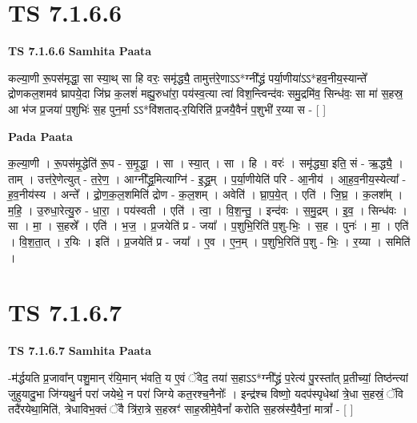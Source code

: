 \documentclass[17pt]{extarticle}
\begin{document}

\section{ TS 7.1.6.6 }

\textbf{TS 7.1.6.6 } \newline
\textbf{Samhita Paata} \newline

कल्या॒णी रू॒पस॑मृद्धा॒ सा स्या॒थ् सा हि वरः॒ समृ॑द्ध्यै॒ तामुत्त॑रे॒णाऽऽ*ग्नी᳚द्ध्रं पर्या॒णीया॑ऽऽ*हव॒नीय॒स्यान्ते᳚ द्रोणकल॒शमव॑ घ्रापये॒दा जि॑घ्र क॒लशं॑ मह्यु॒रुधा॑रा॒ पय॑स्व॒त्या त्वा॑ विश॒न्त्विन्द॑वः समु॒द्रमि॑व॒ सिन्ध॑वः॒ सा मा॑ स॒हस्र॒ आ भ॑ज प्र॒जया॑ प॒शुभिः॑ स॒ह पुन॒र्मा ऽऽ*वि॑शताद्-र॒यिरिति॑ प्र॒जयै॒वैनं॑ प॒शुभी॑ र॒य्या स - [  ] \newline

\textbf{Pada Paata} \newline

क॒ल्या॒णी । रू॒पस॑मृ॒द्धेति॑ रू॒प - स॒मृ॒द्धा॒ । सा । स्या॒त् । सा । हि । वरः॑ । समृ॑द्ध्या॒ इति॒ सं - ऋ॒द्ध्यै॒ । ताम् । उत्त॑रे॒णेत्युत् - त॒रे॒ण॒ । आग्नी᳚द्ध्र॒मित्याग्नि॑ - इ॒द्ध्र॒म् । प॒र्या॒णीयेति॑ परि - आ॒नीय॑ । आ॒ह॒व॒नीय॒स्येत्या᳚ - ह॒व॒नीय॑स्य । अन्ते᳚ । द्रो॒ण॒क॒ल॒शमिति॑ द्रोण - क॒ल॒शम् । अवेति॑ । घ्रा॒प॒ये॒त् । एति॑ । जि॒घ्र॒ । क॒लश᳚म् । म॒हि॒ । उ॒रुधा॒रेत्यु॒रु - धा॒रा॒ । पय॑स्वती । एति॑ । त्वा॒ । वि॒श॒न्तु॒ । इन्द॑वः । स॒मु॒द्रम् । इ॒व॒ । सिन्ध॑वः । सा । मा॒ । स॒हस्रे᳚ । एति॑ । भ॒ज॒ । प्र॒जयेति॑ प्र - जया᳚ । प॒शुभि॒रिति॑ प॒शु-भिः॒ । स॒ह । पुनः॑ । मा॒ । एति॑ । वि॒श॒ता॒त् । र॒यिः । इति॑ । प्र॒जयेति॑ प्र - जया᳚ । ए॒व । ए॒न॒म् । प॒शुभि॒रिति॑ प॒शु - भिः॒ । र॒य्या । समिति॑ ।  \newline





\section{ TS 7.1.6.7 }

\textbf{TS 7.1.6.7 } \newline
\textbf{Samhita Paata} \newline

-म॑र्द्धयति प्र॒जावा᳚न् पशु॒मान् र॑यि॒मान् भ॑वति॒ य ए॒वं ॅवेद॒ तया॑ स॒हाऽऽ*ग्नी᳚द्ध्रं प॒रेत्य॑ पु॒रस्ता᳚त् प्र॒तीच्यां॒ तिष्ठ॑न्त्यां जुहुयादु॒भा जि॑ग्यथु॒र्न परा॑ जयेथे॒ न परा॑ जिग्ये कत॒रश्च॒नैनोः᳚ । इन्द्र॑श्च विष्णो॒ यदप॑स्पृधेथां त्रे॒धा स॒हस्रं॒ ॅवि तदै॑रयेथा॒मिति॑, त्रेधाविभ॒क्तं ॅवै त्रि॑रा॒त्रे स॒हस्रꣳ॑ साह॒स्रीमे॒वैनां᳚ करोति स॒हस्र॑स्यै॒वैनां॒ मात्रां᳚ - [  ] \newline
\end{document}
